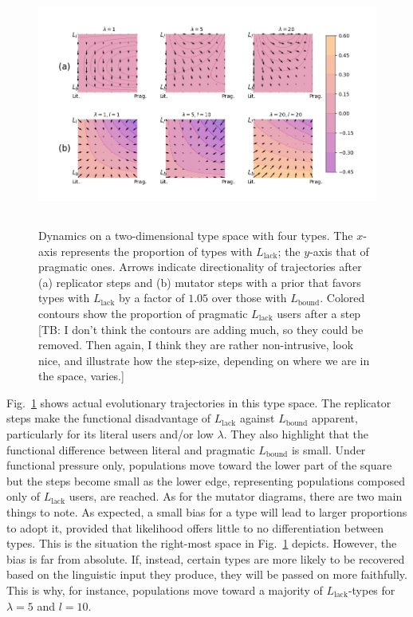 \documentclass[a4paper, 11pt]{article}
\theoremstyle{Satz}
\newcommand{\tb}[1]{\textcolor[rgb]{.8,.33,.0}{[TB: #1]}}%
\newcommand{\mylang}[1]{\ensuremath{L_{\text{#1}}}\xspace} %
\newcommand{\Lbound}{\mylang{bound}}
\newcommand{\Llack}{\mylang{lack}}
\begin{document}
\begin{figure}[t]
\centering
\includegraphics[width=\textwidth,height=8cm, keepaspectratio]{./plots/fig-contourb105k5.png}
\caption{Dynamics on a two-dimensional type space with four types. The $x$-axis represents the proportion of types with $\Llack$; the $y$-axis that of pragmatic ones. Arrows indicate directionality of trajectories after (a) replicator steps and (b) mutator steps with a prior that favors types with $\Llack$ by a factor of $1.05$ over those with $\Lbound$. Colored contours show the proportion of pragmatic $\Llack$ users after a step \tb{I don't think the contours are adding much, so they could be removed. Then again, I think they are rather non-intrusive, look nice, and illustrate how the step-size, depending on where we are in the space, varies.}}

\label{fig:quiver}
\end{figure}

Fig.~\ref{fig:quiver} shows actual evolutionary trajectories in this type space. The replicator steps make the functional disadvantage of $\Llack$ against $\Lbound$ apparent, particularly for its literal users and/or low $\lambda$. They also highlight that the functional difference between literal and pragmatic $\Lbound$ is small. Under functional pressure only, populations move toward the lower part of the square but the steps become small as the lower edge, representing populations composed only  of $\Llack$ users, are reached. As for the mutator diagrams, there are two main things to note. As expected, a small bias for a type will lead to larger proportions to adopt it, provided that likelihood offers little to no differentiation between types. This is the situation the right-most space in Fig.~\ref{fig:quiver} depicts. However, the bias is far from absolute. If, instead, certain types are more likely to be recovered based on the linguistic input they produce, they will be passed on more faithfully. This is why, for instance, populations move toward a majority of $\Llack$-types for $\lambda = 5$ and $l = 10$.
\end{document}

